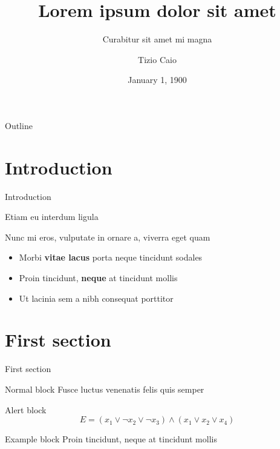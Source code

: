 \documentclass{beamer}
\title{Lorem ipsum dolor sit amet}
\subtitle{Curabitur sit amet mi magna}
\author{Tizio Caio}
\date{January 1, 1900}
\begin{document}
	\maketitle

	\begin{frame}{Outline}
		\tableofcontents
	\end{frame}


	\section{Introduction}

	\begin{frame}{Introduction}

		Etiam eu interdum ligula

		Nunc mi eros, vulputate in ornare a, viverra eget quam \vspace{.5em}

		\begin{itemize}
			\item Morbi \textbf{vitae lacus} porta neque tincidunt sodales \vspace{.5em}
			\item Proin tincidunt, \textbf{neque} at tincidunt mollis \vspace{.5em}
			\item Ut \alert{lacinia sem a nibh} consequat porttitor
		\end{itemize}
	\end{frame}


	\section{First section}

	\begin{frame}{First section}
		\begin{block}{Normal block}
			Fusce luctus venenatis felis quis semper
		\end{block}

		\begin{alertblock}{Alert block}
			$$ E = (x_1 \vee \neg x_2 \vee \neg x_3) \wedge (x_1 \vee x_2 \vee x_4) $$
		\end{alertblock}

		\begin{exampleblock}{Example block}
			Proin tincidunt, neque at tincidunt mollis
		\end{exampleblock}
	\end{frame}
\end{document}
